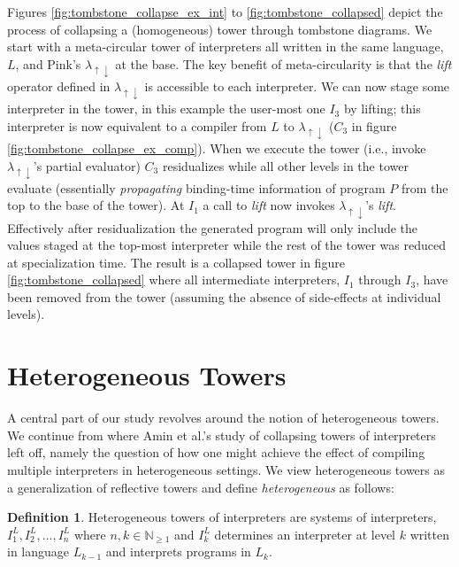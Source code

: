 \documentclass[sigplan,anonymous,review]{acmart}
\newcommand{\mslang}{$\lambda_{\uparrow\downarrow}$}
\theoremstyle{definition}
\newtheorem{definition}{Definition}[section]
\begin{document}
Figures \ref{fig:tombstone_collapse_ex_int} to \ref{fig:tombstone_collapsed} depict the process of collapsing a (homogeneous) tower through tombstone diagrams. We start with a meta-circular tower of interpreters all written in the same language, $L$, and Pink's \mslang{} at the base. The key benefit of meta-circularity is that the \textit{lift} operator defined in \mslang{} is accessible to each interpreter. We can now stage some interpreter in the tower, in this example the user-most one $I_3$ by lifting; this interpreter is now equivalent to a compiler from $L$ to \mslang{} ($C_3$ in figure \ref{fig:tombstone_collapse_ex_comp}). When we execute the tower (i.e., invoke \mslang's partial evaluator) $C_3$ residualizes while all other levels in the tower evaluate (essentially \textit{propagating} binding-time information of program $P$ from the top to the base of the tower). At $I_1$ a call to \textit{lift} now invokes \mslang's \textit{lift}. Effectively after residualization the generated program will only include the values staged at the top-most interpreter while the rest of the tower was reduced at specialization time. The result is a collapsed tower in figure \ref{fig:tombstone_collapsed} where all intermediate interpreters, $I_1$ through $I_3$, have been removed from the tower (assuming the absence of side-effects at individual levels).

\section{Heterogeneous Towers}\label{sec:heterogeneity}
A central part of our study revolves around the notion of heterogeneous towers. We continue from where Amin et al.'s study of collapsing towers of interpreters~\cite{amin2017collapsing} left off, namely the question of how one might achieve the effect of compiling multiple interpreters in heterogeneous settings. We view heterogeneous towers as a generalization of reflective towers and define \textit{heterogeneous} as follows:

\theoremstyle{definition}
\begin{definition}
	Heterogeneous towers of interpreters are systems of interpreters, $I^L_1, I^L_2, ..., I^L_n$ where $n,k \in \mathbb N_{\ge 1}$ and $I^L_k$ determines an interpreter at level $k$ written in language $L_{k-1}$ and interprets programs in $L_k$.
\end{definition}
\end{document}

